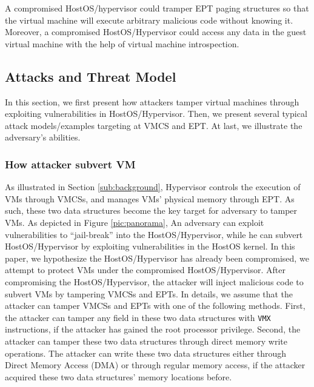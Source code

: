 A compromised HostOS/hypervisor could tramper EPT paging structures so that the virtual machine will execute arbitrary malicious code without knowing it. 
Moreover, a compromised HostOS/Hypervisor could access any data in the guest virtual machine with the help of virtual machine introspection.



\subsection{Attacks and Threat Model} \label{sub:thretmodel}

In this section, we first present how attackers tamper virtual machines through exploiting vulnerabilities in HostOS/Hypervisor. Then, we present several typical attack models/examples targeting at VMCS and EPT. At last, we illustrate the adversary's abilities. 

\subsubsection{How attacker subvert VM}
As illustrated in Section \ref{sub:background}, Hypervisor controls the execution of VMs through VMCSs, and manages VMs' physical memory through EPT. As such, these two data structures become the key target for adversary to tamper VMs. 
As depicted in Figure \ref{pic:panorama}, 
An adversary can exploit vulnerabilities to ``jail-break'' into the HostOS/Hypervisor, while he can subvert HostOS/Hypervisor by exploiting vulnerabilities in the HostOS kernel.
In this paper, we hypothesize the HostOS/Hypervisor has already been compromised, we attempt to protect VMs under the compromised HostOS/Hypervisor. 
After compromising the HostOS/Hypervisor, the attacker will inject malicious code to subvert VMs by tampering VMCSs and EPTs.
In details, we assume that the attacker can tamper VMCSs and EPTs with one of the following methods. First, the attacker can tamper any field in these two data structures with \verb|VMX| instructions, if the attacker has gained the root processor privilege. Second, the attacker can tamper these two data structures through direct memory write operations. The attacker can write these two data structures either through Direct Memory Access (DMA) or through regular memory access, if the attacker acquired these two data structures' memory locations before.  


